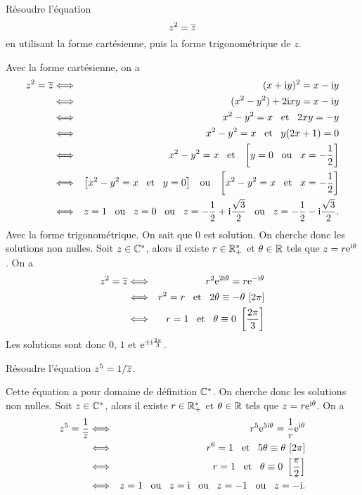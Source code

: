 \documentclass{magnolia}
\begin{document}
\begin{exos}
\exo Résoudre l'équation
  \[z^2=\overline{z}\]
  en utilisant la forme cartésienne, puis la forme trigonométrique de $z$.
  \begin{sol}
Avec la forme cartésienne, on a
\begin{eqnarray*}
z^2=\conj{z}
&\ssi& (x+\ii y)^2=x-\ii y\\
&\ssi& (x^2-y^2)+2\ii x y=x-\ii y\\
&\ssi& x^2-y^2=x \et 2xy=-y\\
&\ssi& x^2-y^2=x \et y(2x+1)=0\\
&\ssi& x^2-y^2=x \et \cro{y=0 \ou x=-\frac{1}{2}}\\
&\ssi& \cro{x^2-y^2=x \et y=0} \ou \cro{x^2-y^2=x \et x=-\frac{1}{2}}\\
&\ssi& z=1 \ou z=0 \ou z=-\frac{1}{2}+\ii\frac{\sqrt{3}}{2} \ou z=-\frac{1}{2}-\ii\frac{\sqrt{3}}{2}.
\end{eqnarray*}
  Avec la forme trigonométrique. On sait que 0 est solution. On cherche donc les solutions non nulles. Soit $z\in\mathbb{C}^*$, alors il existe $r\in\mathbb{R}_+^*$ et $\theta\in\mathbb{R}$ tels que $z=r{\rm e}^{{\rm i}\theta}$. On a
\begin{eqnarray*}
z^2=\overline{z}
&\Longleftrightarrow& r^2 {\rm e}^{2{\rm i}\theta} = r {\rm e}^{-{\rm i}\theta}\\
&\Longleftrightarrow& r^2=r \quad\!\text{et}\quad\! 2\theta\equiv -\theta\ [2\pi]\\
&\Longleftrightarrow& r=1 \quad\!\text{et}\quad\! \theta\equiv 0\ \left[\frac{2\pi}{3}\right]\\
\end{eqnarray*}
Les solutions sont donc $0$, $1$ et ${\rm e}^{\pm{\rm i}\frac{2\pi}{3}}$.
  \end{sol}
\exo Résoudre l'équation $z^5=1/\overline{z}$.
\begin{sol}
Cette équation a pour domaine de définition $\mathbb{C}^*$. On cherche donc les solutions non nulles. Soit $z\in\mathbb{C}^*$, alors il existe $r\in\mathbb{R}_+^*$ et $\theta\in\mathbb{R}$ tels que $z=r{\rm e}^{{\rm i}\theta}$. On a
\begin{eqnarray*}
z^5=\frac{1}{\conj{z}}
&\ssi& r^5 \e^{5\ii\theta} = \frac{1}{r} \e^{\ii\theta}\\
&\ssi& r^6=1 \et 5\theta\equiv \theta\ [2\pi]\\
&\ssi& r=1 \et \theta\equiv 0\ \cro{\frac{\pi}{2}}\\
&\ssi& z=1 \ou z=\ii \ou z=-1 \ou z=-\ii.
\end{eqnarray*}
  \end{sol}
\end{exos}
\end{document}
